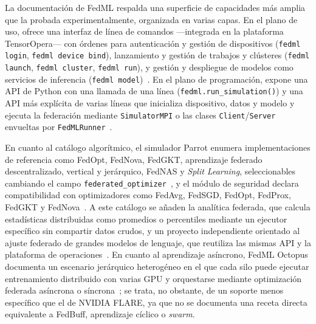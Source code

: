 La documentación de FedML respalda una superficie de capacidades más amplia que la
probada experimentalmente, organizada en varias capas. En el plano de uso, ofrece una
interfaz de línea de comandos —integrada en la plataforma TensorOpera— con órdenes para
autenticación y gestión de dispositivos (\texttt{fedml login}, \texttt{fedml device
bind}), lanzamiento y gestión de trabajos y clústeres (\texttt{fedml launch},
\texttt{fedml cluster}, \texttt{fedml run}), y gestión y despliegue de modelos como
servicios de inferencia (\texttt{fedml model})~\parencite{fedmlExamples}. En el plano de
programación, expone una API de Python con una llamada de una línea
(\texttt{fedml.run\_\allowbreak simulation()}) y una API más explícita de varias líneas que
inicializa dispositivo, datos y modelo y ejecuta la federación mediante
\texttt{SimulatorMPI} o las clases \texttt{Client}/\texttt{Server} envueltas por
\texttt{FedMLRunner}~\parencite{fedmlSimApi}.

En cuanto al catálogo algorítmico, el simulador Parrot enumera implementaciones de
referencia como FedOpt, FedNova, FedGKT, aprendizaje federado descentralizado, vertical
y jerárquico, FedNAS y \textit{Split Learning}, seleccionables cambiando el campo
\texttt{federated\_\allowbreak optimizer}~\parencite{fedmlSimOverview,fedmlSimApi}, y el módulo de
seguridad declara compatibilidad con optimizadores como FedAvg, FedSGD, FedOpt, FedProx,
FedGKT y FedNova~\parencite{fedmlSecurity}. A este catálogo se añaden la analítica
federada, que calcula estadísticas distribuidas como promedios o percentiles mediante un
ejecutor específico sin compartir datos crudos, y un proyecto independiente orientado al
ajuste federado de grandes modelos de lenguaje, que reutiliza las mismas API y la
plataforma de operaciones~\parencite{fedmlExamples}. En cuanto al aprendizaje asíncrono,
FedML Octopus documenta un escenario jerárquico heterogéneo en el que cada silo puede
ejecutar entrenamiento distribuido con varias GPU y orquestarse mediante optimización
federada asíncrona o síncrona~\parencite{fedmlCrossSilo}; se trata, no obstante, de un
soporte menos específico que el de NVIDIA FLARE, ya que no se documenta una receta directa
equivalente a FedBuff, aprendizaje cíclico o \textit{swarm}.

